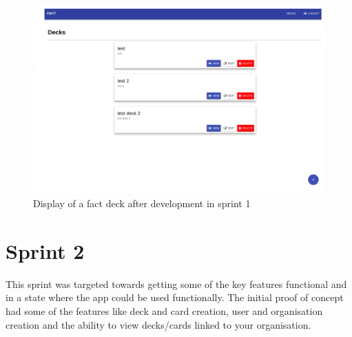 \begin{figure}
\includegraphics[width=\textwidth]{s1}
\caption{Display of a fact deck after development in sprint 1}
\centering
\end{figure}

\section{Sprint 2}
This sprint was targeted towards getting some of the key features functional and in a state where the app could be used functionally. The initial proof of concept had some of the features like deck and card creation, user and organisation creation and the ability to view decks/cards linked to your organisation.
